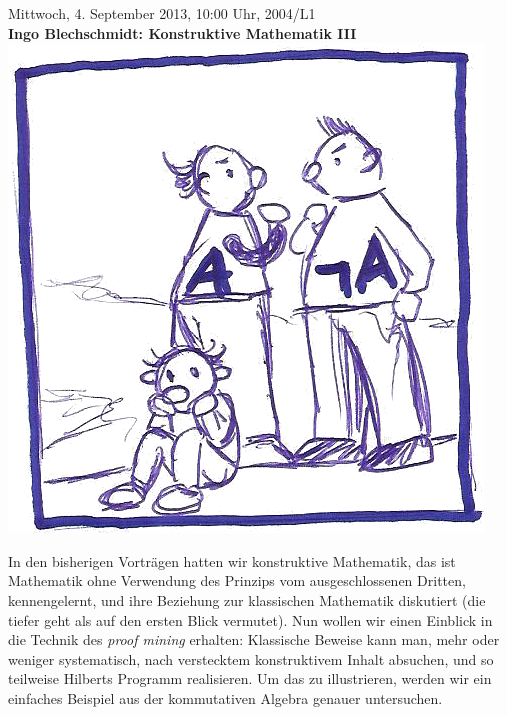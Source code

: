 \documentclass[a4paper,ngerman,landscape]{scrartcl}
\begin{document}
\begin{center}
  \Huge
  Mittwoch, 4. September 2013, 10:00 Uhr, 2004/L1 \\
  \textbf{Ingo Blechschmidt: Konstruktive Mathematik III}
  \vfill
  \includegraphics[scale=1.6]{lem}
  \vfill

  \Large
  \begin{minipage}{0.91\textwidth}
    \setlength\parskip{\medskipamount}
    In den bisherigen Vorträgen hatten wir konstruktive Mathematik,
    das ist Mathematik ohne Verwendung des Prinzips vom ausgeschlossenen Dritten,
    kennengelernt, und ihre Beziehung zur klassischen Mathematik diskutiert
    (die tiefer geht als auf den ersten Blick vermutet). Nun wollen wir einen
    Einblick in die Technik des \emph{proof mining} erhalten: Klassische
    Beweise kann man, mehr oder weniger systematisch, nach verstecktem
    konstruktivem Inhalt absuchen, und so teilweise Hilberts Programm
    realisieren. Um das zu illustrieren, werden wir ein einfaches Beispiel aus
    der kommutativen Algebra genauer untersuchen.
  \end{minipage}
\end{center}

\newpage
\end{document}
